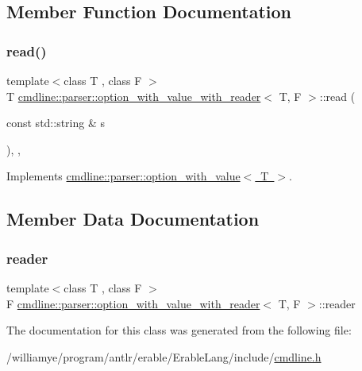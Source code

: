 \subsection{Member Function Documentation}
\mbox{\label{classcmdline_1_1parser_1_1option__with__value__with__reader_a47db1ae274bc54b14d8f4e414ce3549a}} 
\subsubsection{\texorpdfstring{read()}{read()}}
{\footnotesize\ttfamily template$<$class T , class F $>$ \\
T \mbox{\hyperlink{classcmdline_1_1parser_1_1option__with__value__with__reader}{cmdline\+::parser\+::option\+\_\+with\+\_\+value\+\_\+with\+\_\+reader}}$<$ T, F $>$\+::read (\begin{DoxyParamCaption}\item[{const std\+::string \&}]{s }\end{DoxyParamCaption})\hspace{0.3cm}{\ttfamily [inline]}, {\ttfamily [private]}, {\ttfamily [virtual]}}



Implements \mbox{\hyperlink{classcmdline_1_1parser_1_1option__with__value_acb922af893f383b1e00d355d7f3b6b75}{cmdline\+::parser\+::option\+\_\+with\+\_\+value$<$ T $>$}}.



\subsection{Member Data Documentation}
\mbox{\label{classcmdline_1_1parser_1_1option__with__value__with__reader_a1d06ee0129f99751c6461b7fe3dc844b}} 
\subsubsection{\texorpdfstring{reader}{reader}}
{\footnotesize\ttfamily template$<$class T , class F $>$ \\
F \mbox{\hyperlink{classcmdline_1_1parser_1_1option__with__value__with__reader}{cmdline\+::parser\+::option\+\_\+with\+\_\+value\+\_\+with\+\_\+reader}}$<$ T, F $>$\+::reader\hspace{0.3cm}{\ttfamily [private]}}



The documentation for this class was generated from the following file\+:\begin{DoxyCompactItemize}
\item 
/williamye/program/antlr/erable/\+Erable\+Lang/include/\mbox{\hyperlink{cmdline_8h}{cmdline.\+h}}\end{DoxyCompactItemize}
